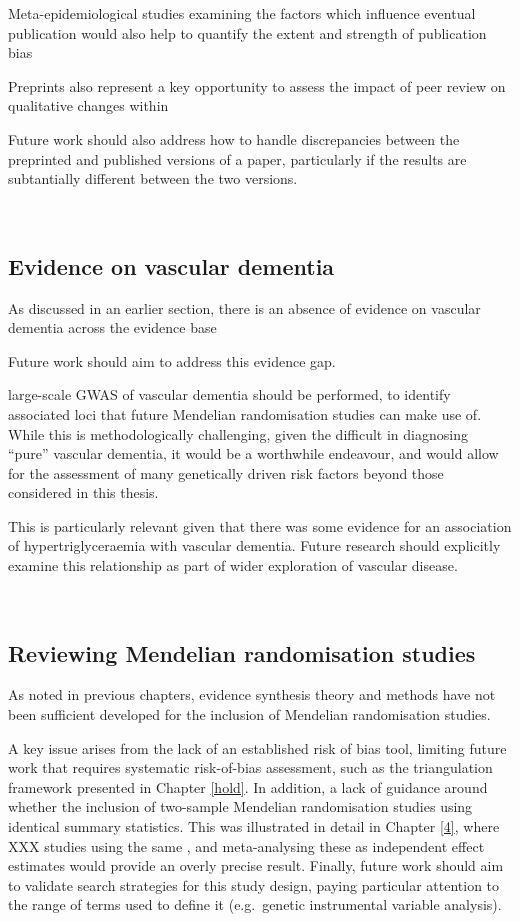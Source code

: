 \documentclass[a4paper, twoside]{templates/ociamthesis}
\begin{document}
Meta-epidemiological studies examining the factors which influence eventual publication would also help to quantify the extent and strength of publication bias

Preprints also represent a key opportunity to assess the impact of peer review on qualitative changes within

Future work should also address how to handle discrepancies between the preprinted and published versions of a paper, particularly if the results are subtantially different between the two versions.

~

\hypertarget{evidence-on-vascular-dementia}{%
\subsection{Evidence on vascular dementia}\label{evidence-on-vascular-dementia}}

As discussed in an earlier section, there is an absence of evidence on vascular dementia across the evidence base

Future work should aim to address this evidence gap.

large-scale GWAS of vascular dementia should be performed, to identify associated loci that future Mendelian randomisation studies can make use of. While this is methodologically challenging, given the difficult in diagnosing ``pure'' vascular dementia, it would be a worthwhile endeavour, and would allow for the assessment of many genetically driven risk factors beyond those considered in this thesis.

This is particularly relevant given that there was some evidence for an association of hypertriglyceraemia with vascular dementia. Future research should explicitly examine this relationship as part of wider exploration of vascular disease.

~

\hypertarget{reviewing-mendelian-randomisation-studies}{%
\subsection{Reviewing Mendelian randomisation studies}\label{reviewing-mendelian-randomisation-studies}}

As noted in previous chapters, evidence synthesis theory and methods have not been sufficient developed for the inclusion of Mendelian randomisation studies.

A key issue arises from the lack of an established risk of bias tool, limiting future work that requires systematic risk-of-bias assessment, such as the triangulation framework presented in Chapter \ref{hold}. In addition, a lack of guidance around whether the inclusion of two-sample Mendelian randomisation studies using identical summary statistics. This was illustrated in detail in Chapter \ref{4}, where XXX studies using the same , and meta-analysing these as independent effect estimates would provide an overly precise result. Finally, future work should aim to validate search strategies for this study design, paying particular attention to the range of terms used to define it (e.g.~genetic instrumental variable analysis).
\end{document}
